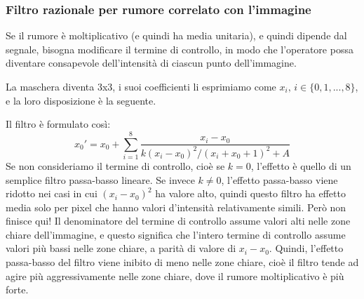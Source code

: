 \documentclass[a4paper,11pt]{article}
\begin{document}
\subsubsection{Filtro razionale per rumore correlato con l'immagine}
Se il rumore è moltiplicativo (e quindi ha media unitaria), e quindi dipende dal segnale, bisogna modificare il termine di controllo,
in modo che l'operatore possa diventare consapevole dell'intensità di ciascun punto dell'immagine.
\par
La maschera diventa 3x3, i suoi coefficienti li esprimiamo come $x_i, \, i \in \{0, 1, ..., 8\}$, e la loro disposizione è la seguente.
\begin{center}
\end{center}
Il filtro è formulato così:
\[
x_0' = x_0 + \sum_{i=1}^{8} \frac{x_i - x_0}{k(x_i - x_0)^2/(x_i + x_0 + 1)^2 + A}
\]
Se non consideriamo il termine di controllo, cioè se $k=0$, l'effetto è quello di un semplice filtro passa-basso lineare.
Se invece $k \ne 0$, l'effetto passa-basso viene ridotto nei casi in cui $(x_i - x_0)^2$ ha valore alto, quindi questo filtro ha effetto media solo
per pixel che hanno valori d'intensità relativamente simili. Però non finisce qui! Il denominatore del termine di controllo assume valori alti nelle
zone chiare dell'immagine, e questo significa che l'intero termine di controllo assume valori più bassi nelle zone chiare, a parità di valore di $x_i - x_0$.
Quindi, l'effetto passa-basso del filtro viene inibito di meno nelle zone chiare, cioè il filtro tende ad agire più aggressivamente nelle zone chiare,
dove il rumore moltiplicativo è più forte.
\end{document}
